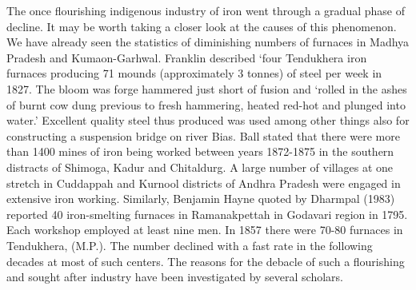 The once flourishing indigenous industry of iron went through a gradual phase of decline. It may be worth taking a closer look at the causes of this phenomenon. We have already seen the statistics of diminishing numbers of furnaces in Madhya Pradesh and Kumaon-Garhwal. Franklin described `four Tendukhera iron furnaces producing 71 mounds (approximately 3 tonnes) of steel per week in 1827. The bloom was forge hammered just short of fusion and ‘rolled in the ashes of burnt cow dung previous to fresh hammering, heated red-hot and plunged into water.’ Excellent quality steel thus produced was used among other things also for constructing a suspension bridge on river Bias. Ball stated that there were more than 1400 mines of iron being worked between years 1872-1875 in the southern distracts of Shimoga, Kadur and Chitaldurg. A large number of villages at one stretch in Cuddappah and Kurnool districts of Andhra Pradesh were engaged in extensive iron working. Similarly, Benjamin Hayne quoted by Dharmpal (1983) reported 40 iron-smelting furnaces in Ramanakpettah in Godavari region in 1795. Each workshop employed at least nine men.  In 1857 there were 70-80 furnaces in Tendukhera, (M.P.). The number declined with a fast rate in the following decades at most of such centers. The reasons for the debacle of such a flourishing and sought after industry have been investigated by several scholars.

\vspace{-.2cm}

